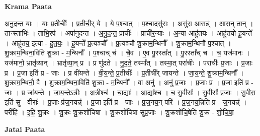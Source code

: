 \documentclass[17pt]{extarticle}
\begin{document}
\textbf{Krama Paata} \newline

अ॒नु॒द॒न्त॒ याः । याः प्र॒तीचीः᳚ । प्र॒तीची॒र् ये । ये प॒श्चात् । प॒श्चादसु॑राः । असु॑रा॒ आसन्न्॑ । आस॒न् तान् । ताꣳस्ताभिः॑ । ताभि॒रप॑ । अपा॑नुदन्त । अ॒नु॒द॒न्त॒ प्राचीः᳚ । प्राची॑र॒न्याः । अ॒न्या आहु॑तयः । आहु॑तयो हू॒यन्ते᳚ । आहु॑तय॒ इत्या - हु॒त॒यः॒ । हू॒यन्ते᳚ प्र॒त्यञ्चौ᳚ । प्र॒त्यञ्चौ॑ शु॒क्राम॒न्थिनौ᳚ । शु॒क्राम॒न्थिनौ॑ प॒श्चात् । शु॒क्राम॒न्थिना॒विति॑ शु॒क्रा - म॒न्थिनौ᳚ । प॒श्चाच् च॑ । चै॒व । ए॒व पु॒रस्ता᳚त् । पु॒रस्ता᳚च् च । च॒ यज॑मानः । यज॑मानो॒ भ्रातृ॑व्यान् । भ्रातृ॑व्या॒न् प्र । प्र णु॑दते । नु॒द॒ते॒ तस्मा᳚त् । तस्मा॒त् परा॑चीः । परा॑चीः प्र॒जाः । प्र॒जाः प्र । प्र॒जा इति॑ प्र - जाः । प्र वी॑यन्ते । वी॒य॒न्ते॒ प्र॒तीचीः᳚ । प्र॒तीची᳚र् जायन्ते । जा॒य॒न्ते॒ शु॒क्राम॒न्थिनौ᳚ । शु॒क्राम॒न्थिनौ॒ वै । शु॒क्राम॒न्थिना॒विति॑ शु॒क्रा - म॒न्थिनौ᳚ । वा अनु॑ । अनु॑ प्र॒जाः । प्र॒जाः प्र । प्र॒जा इति॑ प्र - जाः । प्र जा॑यन्ते । जा॒य॒न्ते॒ऽत्रीः । अ॒त्रीश्च॑ । चा॒द्याः᳚ । आ॒द्या᳚श्च । च॒ सु॒वीराः᳚ । सु॒वीराः᳚ प्र॒जाः । सु॒वीरा॒ इति॑ सु - वीराः᳚ । प्र॒जाः प्र॑ज॒नयन्न्॑ । प्र॒जा इति॑ प्र - जाः । प्र॒ज॒नय॒न् परि॑ । प्र॒ज॒नय॒न्निति॑ प्र - ज॒नयन्न्॑ । परी॑हि । इ॒हि॒ शु॒क्रः । शु॒क्रः शु॒क्रशो॑चिषा । शु॒क्रशो॑चिषा सुप्र॒जाः । शु॒क्रशो॑चि॒षेति॑ शु॒क्र - शो॒चि॒षा॒ \newline

\textbf{Jatai Paata} \newline
\end{document}
